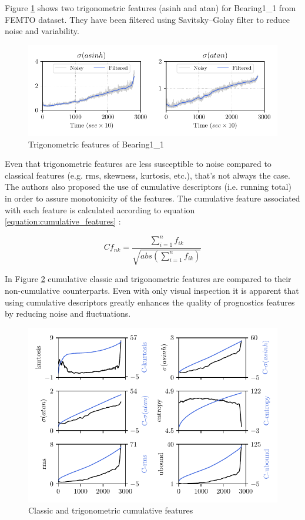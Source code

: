 Figure \ref{fig:trigonometric_features_bearing1_1} shows two trigonometric features (asinh and atan) for Bearing1\_1 from FEMTO dataset. They have been filtered using Savitsky--Golay filter to reduce noise and variability.

\begin{figure}[h]
	\centering
	\includegraphics[width=0.8\linewidth]{figures/trigonometric_features.pdf}
	\caption{Trigonometric features of Bearing1\_1}%
	\label{fig:trigonometric_features_bearing1_1}
\end{figure}


Even that trigonometric features are less susceptible to noise compared to classical features (e.g. rms, skewness, kurtosis, etc.), that's not always the case. The authors also proposed the use of cumulative descriptors (i.e. running total) in order to assure monotonicity of the features. The cumulative feature associated with each feature is calculated according to equation \ref{equation:cumulative_features} :

\begin{equation}
Cf_{nk} = \frac{\sum_{i=1}^n f_{ik}} {\sqrt{abs\left(\sum_{i=1}^nf_{ik}\right)}}
\label{equation:cumulative_features}
\end{equation}

In Figure \ref{fig:trig_classic_cumulative_features} cumulative classic and trigonometric features are compared to their non-cumulative counterparts. Even with only visual inspection it is apparent that using cumulative descriptors greatly enhances the quality of prognostics features by reducing noise and fluctuations. 

\begin{figure}[H]
	\centering
	\includegraphics[width=0.8\linewidth]{figures/trig_classic_cumulative_features.pdf}
	\caption{Classic and trigonometric cumulative features}%
	\label{fig:trig_classic_cumulative_features}
\end{figure}

